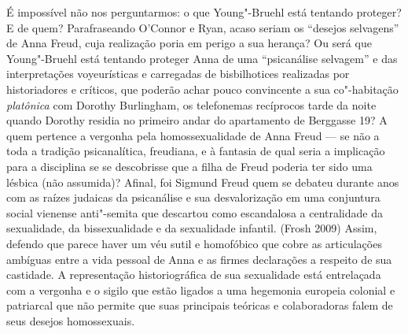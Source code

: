 É impossível não nos perguntarmos: o que Young"-Bruehl está tentando
proteger? E de quem? Parafraseando O'Connor e Ryan, acaso seriam os
``desejos selvagens'' de Anna Freud, cuja realização poria em perigo a sua
herança? Ou será que Young"-Bruehl está tentando proteger Anna de uma
``psicanálise selvagem'' e das interpretações voyeurísticas e carregadas
de bisbilhotices realizadas por historiadores e críticos, que poderão
achar pouco convincente a sua co"-habitação \emph{platônica} com Dorothy
Burlingham, os telefonemas recíprocos tarde da noite quando Dorothy
residia no primeiro andar do apartamento de Berggasse 19? A quem
pertence a vergonha pela homossexualidade de Anna Freud --- se não a toda
a tradição psicanalítica, freudiana, e à fantasia de qual seria a
implicação para a disciplina se se descobrisse que a filha de Freud
poderia ter sido uma lésbica (não assumida)? Afinal, foi Sigmund Freud
quem se debateu durante anos com as raízes judaicas da psicanálise e sua
desvalorização em uma conjuntura social vienense anti"-semita que
descartou como escandalosa a centralidade da sexualidade, da
bissexualidade e da sexualidade infantil. (Frosh 2009) Assim, defendo
que parece haver um véu sutil e homofóbico que cobre as articulações
ambíguas entre a vida pessoal de Anna e as firmes declarações a respeito
de sua castidade. A representação historiográfica de sua sexualidade
está entrelaçada com a vergonha e o sigilo que estão ligados a uma
hegemonia europeia colonial e patriarcal que não permite que suas
principais teóricas e colaboradoras falem de seus desejos homossexuais.

